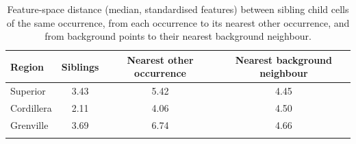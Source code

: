 \documentclass[pdflatex,sn-apa]{sn-jnl}
\begin{document}
\begin{table}[t]
\caption{Feature-space distance (median, standardised features) between sibling child cells of the same occurrence, from each occurrence to its nearest other occurrence, and from background points to their nearest background neighbour.}\label{tab:audit-sim}
\footnotesize
\begin{tabular*}{0.8\textwidth}{@{\extracolsep\fill}lccc}
\toprule
Region & Siblings & Nearest other occurrence & Nearest background neighbour \\
\midrule
Superior & 3.43 & 5.42 & 4.45 \\
Cordillera & 2.11 & 4.06 & 4.50 \\
Grenville & 3.69 & 6.74 & 4.66 \\
\botrule
\end{tabular*}
\end{table}
\end{document}
